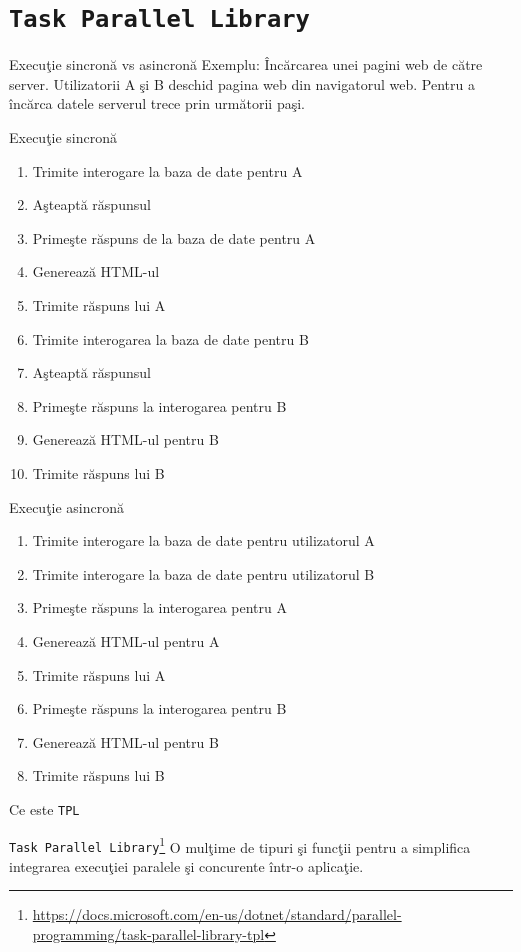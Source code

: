 \documentclass[presentation]{beamer}
\begin{document}
\section{\texttt{Task Parallel Library}}
\label{sec:org694d1e9}
\begin{frame}[label={sec:org6c676a3}]{Execuţie sincronă vs asincronă}
Exemplu: Încărcarea unei pagini web de către server.
\vskip 0.1in
Utilizatorii A  şi B deschid pagina web din navigatorul web. Pentru a încărca datele serverul trece prin următorii paşi.
\end{frame}
\begin{frame}[label={sec:org960d5ba}]{Execuţie sincronă}
\begin{enumerate}
\item Trimite interogare la baza de date pentru A
\item Aşteaptă răspunsul
\item Primeşte răspuns de la baza de date pentru A
\item Generează HTML-ul
\item Trimite răspuns lui A
\item Trimite interogarea la baza de date pentru B
\item Aşteaptă răspunsul
\item Primeşte răspuns la interogarea pentru B
\item Generează HTML-ul pentru B
\item Trimite răspuns lui B
\end{enumerate}
\end{frame}
\begin{frame}[label={sec:org70d8a11}]{Execuţie asincronă}
\begin{enumerate}
\item Trimite interogare la baza de date pentru utilizatorul A
\item Trimite interogare la baza de date pentru utilizatorul B
\item Primeşte răspuns la interogarea pentru A
\item Generează HTML-ul pentru A
\item Trimite răspuns lui A
\item Primeşte răspuns la interogarea pentru B
\item Generează HTML-ul pentru B
\item Trimite răspuns lui B
\end{enumerate}
\end{frame}
\begin{frame}[label={sec:org173a7ef},fragile]{Ce este \texttt{TPL}}
 \begin{block}{\texttt{Task Parallel Library}\footnote{\url{https://docs.microsoft.com/en-us/dotnet/standard/parallel-programming/task-parallel-library-tpl}}}
\vskip 0.1in
O mulţime de tipuri şi funcţii pentru a simplifica integrarea execuţiei paralele şi concurente într-o aplicaţie.
\end{block}
\end{frame}
\end{document}
